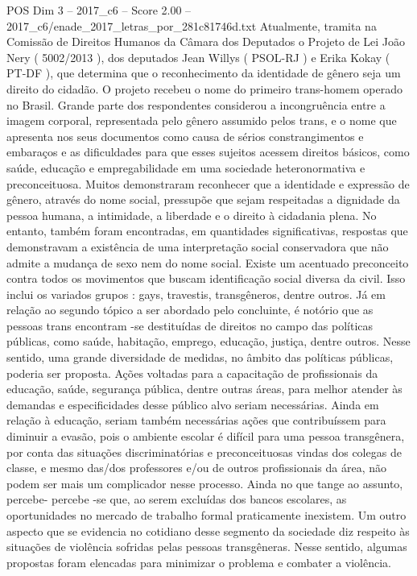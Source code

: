 \begin{textsample}{POS Dim 3 – 2017\_c6 – Score 2.00 – 2017\_c6/enade\_2017\_letras\_por\_281c81746d.txt}
Atualmente, tramita na Comissão de Direitos Humanos da Câmara dos Deputados o Projeto de Lei João Nery ( 5002/2013 ), dos deputados Jean Willys ( PSOL-RJ ) e Erika Kokay ( PT-DF ), que determina que o reconhecimento da identidade de gênero seja um direito do cidadão.
O projeto recebeu o nome do primeiro trans-homem operado no Brasil.
Grande parte dos respondentes considerou a incongruência entre a imagem corporal, representada pelo gênero assumido pelos trans, e o nome que apresenta nos seus documentos como causa de sérios constrangimentos e embaraços e as dificuldades para que esses sujeitos acessem direitos básicos, como saúde, educação e empregabilidade em uma sociedade heteronormativa e preconceituosa.
Muitos demonstraram reconhecer que a identidade e expressão de gênero, através do nome social, pressupõe que sejam respeitadas a dignidade da pessoa humana, a intimidade, a liberdade e o direito à cidadania plena.
No entanto, também foram encontradas, em quantidades significativas, respostas que demonstravam a existência de uma interpretação social conservadora que não admite a mudança de sexo nem do nome social.
Existe um acentuado preconceito contra todos os movimentos que buscam identificação social diversa da civil.
Isso inclui os variados grupos : gays, travestis, transgêneros, dentre outros.
Já em relação ao segundo tópico a ser abordado pelo concluinte, é notório que as pessoas trans encontram -se destituídas de direitos no campo das políticas públicas, como saúde, habitação, emprego, educação, justiça, dentre outros.
Nesse sentido, uma grande diversidade de medidas, no âmbito das políticas públicas, poderia ser proposta.
Ações voltadas para a capacitação de profissionais da educação, saúde, segurança pública, dentre outras áreas, para melhor atender às demandas e especificidades desse público alvo seriam necessárias.
Ainda em relação à educação, seriam também necessárias ações que contribuíssem para diminuir a evasão, pois o ambiente escolar é difícil para uma pessoa transgênera, por conta das situações discriminatórias e preconceituosas vindas dos colegas de classe, e mesmo das/dos professores e/ou de outros profissionais da área, não podem ser mais um complicador nesse processo.
Ainda no que tange ao assunto, percebe- percebe -se que, ao serem excluídas dos bancos escolares, as oportunidades no mercado de trabalho formal praticamente inexistem.
Um outro aspecto que se evidencia no cotidiano desse segmento da sociedade diz respeito às situações de violência sofridas pelas pessoas transgêneras.
Nesse sentido, algumas propostas foram elencadas para minimizar o problema e combater a violência.

\end{textsample}
